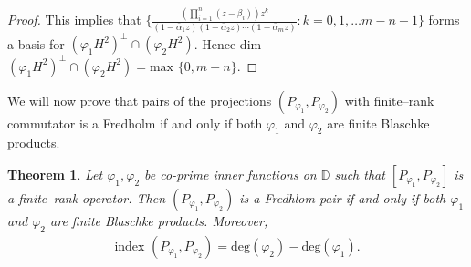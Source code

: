 \documentclass[12pt, a4 paper]{amsart}
\newcommand{\D}{\mathbb{D}}
\theoremstyle{definition}
\theoremstyle{plain}
\newtheorem{thm}{Theorem}[section]
\theoremstyle{definition}
\numberwithin{equation}{section}
\let\phi=\varphi
\begin{document}
\begin{proof}
       This implies that $\{\frac{\left(\prod_{i=1}^{n}(z-\beta_i)\right)z^k}{(1-\bar\alpha_1z)(1-\bar\alpha_2z)\cdots(1-\bar\alpha_mz)}:k=0,1,\ldots m-n-1\}$    forms a basis for   $(\phi_1 H^2)^\perp\cap(\phi_2H^2)$.
            Hence dim $(\phi_1 H^2)^\perp\cap(\phi_2H^2)=\text{max }\{0,m-n\}$. 
     
     \end{proof}
    
We will now prove that pairs of the projections  $(P_{\phi_1}, P_{\phi_2})$ with finite--rank commutator is a Fredholm if and only if both $\phi_1$ and $\phi_2$ are finite Blaschke products.  

\begin{thm}\label{mainfredhlom}
Let $\phi_1,\phi_2$ be  co-prime inner functions on $\D$ such that $[P_{\phi_1},P_{\phi_2}]$ is a finite--rank operator. Then $(P_{\phi_1},P_{\phi_2})$ is a Fredhlom pair if and only if both $\phi_1$ and $\phi_2$ are finite Blaschke products.  Moreover, 
\begin{align*}
        \text{index }(P_{\phi_1},P_{\phi_2})=\text{deg}(\phi_2)-\text{deg}(\phi_1).
    \end{align*}
    \end{thm}
\end{document}
